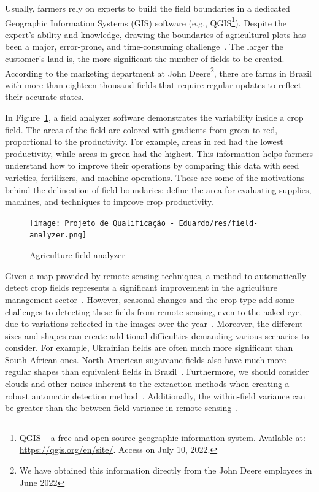 \documentclass[12pt]{article}
\begin{document}
Usually, farmers rely on experts to build the field boundaries in a dedicated Geographic Information Systems (GIS) software (e.g., QGIS\footnote{QGIS -- a free and open source geographic information system. Available at: \url{https://qgis.org/en/site/}. Access on July 10, 2022.}). Despite the expert's ability and knowledge, drawing the boundaries of agricultural plots has been a major, error-prone, and time-consuming challenge~\cite{wagner2020}. The larger the customer's land is, the more significant the number of fields to be created. According to the marketing department at John Deere\footnote{We have obtained this information directly from the John Deere employees in June 2022}, there are farms in Brazil with more than eighteen thousand fields that require regular updates to reflect their accurate states. 

In Figure~\ref{figure:fieldanalyzer}, a field analyzer software demonstrates the variability inside a crop field. The areas of the field are colored with gradients from green to red, proportional to the productivity. For example, areas in red had the lowest productivity, while areas in green had the highest. This information helps farmers understand how to improve their operations by comparing this data with seed varieties, fertilizers, and machine operations. These are some of the motivations behind the delineation of field boundaries: define the area for evaluating supplies, machines, and techniques to improve crop productivity.

\begin{figure}[ht]
\centering
\texttt{[image: Projeto de Qualificação - Eduardo/res/field-analyzer.png]}
\caption{\label{figure:fieldanalyzer}Agriculture field analyzer\protect\footnotemark}
\end{figure}

Given a map provided by remote sensing techniques, a method to automatically detect crop fields represents a significant improvement in the agriculture management sector~\citep{garcia2017,garcia2018,garcia2019}. However, seasonal changes and the crop type add some challenges to detecting these fields from remote sensing, even to the naked eye, due to variations reflected in the images over the year~\citep{north2019}. Moreover, the different sizes and shapes can create additional difficulties demanding various scenarios to consider. For example, Ukrainian fields are often much more significant than South African ones. North American sugarcane fields also have much more regular shapes than equivalent fields in Brazil~\cite{waldner2020}. Furthermore, we should consider clouds and other noises inherent to the extraction methods when creating a robust automatic detection method~\citep{graesser2017,north2019}. Additionally, the within-field variance can be greater than the between-field variance in remote sensing~\cite{evans2002}.
\end{document}
